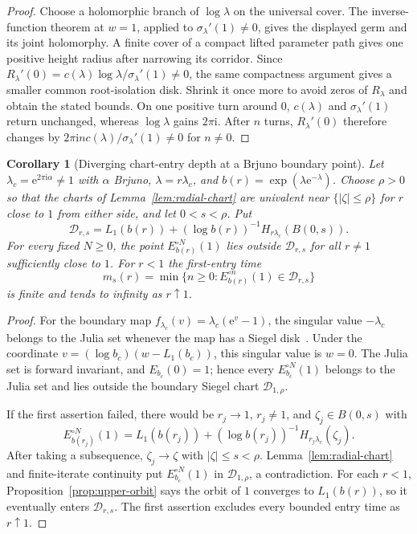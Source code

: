\documentclass[11pt,a4paper]{article}
\newtheorem{corollary}[theorem]{Corollary}
\theoremstyle{definition}
\newcommand{\eee}{\mathrm{e}}
\newcommand{\ii}{\mathrm{i}}
\begin{document}
\begin{proof}
Choose a holomorphic branch of $\log\lambda$ on the
universal cover.  The inverse-function theorem at $w=1$, applied to
$\sigma_\lambda'(1)\ne0$, gives the displayed germ and its joint
holomorphy.  A finite cover of a compact lifted parameter path gives
one positive height radius after narrowing its corridor.  Since
$R_\lambda'(0)=c(\lambda)\log\lambda/\sigma_\lambda'(1)\ne0$,
the same compactness argument gives a smaller common root-isolation
disk.  Shrink it once more to avoid zeros of $R_\lambda$ and obtain
the stated bounds.  On one positive turn around $0$, $c(\lambda)$ and
$\sigma_\lambda'(1)$ return unchanged, whereas $\log\lambda$ gains
$2\pi\ii$.  After $n$ turns, $R_\lambda'(0)$ therefore changes by
$2\pi\ii n c(\lambda)/\sigma_\lambda'(1)\ne0$ for $n\ne0$.
\end{proof}

\begin{corollary}[Diverging chart-entry depth at a Brjuno boundary point]
\label{cor:entry-depth}
Let $\lambda_c=\eee^{2\pi\ii\alpha}\ne1$ with $\alpha$ Brjuno,
$\lambda=r\lambda_c$, and
$b(r)=\exp(\lambda\eee^{-\lambda})$.  Choose $\rho>0$ so that the
charts of Lemma~\ref{lem:radial-chart} are univalent near
$\{|\zeta|\le\rho\}$ for $r$ close to $1$ from either side, and let
$0<s<\rho$.  Put
\[
 \mathcal D_{r,s}=L_1(b(r))+(\log b(r))^{-1}
                         H_{r\lambda_c}(B(0,s)).
\]
For every fixed $N\ge0$, the point $E_{b(r)}^{\circ N}(1)$ lies outside
$\mathcal D_{r,s}$ for all $r\ne1$ sufficiently close to $1$.
For $r<1$ the first-entry time
\[
 m_s(r)=\min\{n\ge0:E_{b(r)}^{\circ n}(1)\in\mathcal D_{r,s}\}
\]
is finite and tends to infinity as $r\uparrow1$.
\end{corollary}

\begin{proof}
For the boundary map $f_{\lambda_c}(v)=\lambda_c(\eee^v-1)$,
the singular value $-\lambda_c$ belongs to the Julia set whenever
the map has a Siegel disk~\cite[Introduction, remark after
Thm.~2]{Rempe2008}.  Under the coordinate
$v=(\log b_c)(w-L_1(b_c))$, this singular value is $w=0$.
The Julia set is forward invariant, and $E_{b_c}(0)=1$; hence
every $E_{b_c}^{\circ N}(1)$ belongs to the Julia set and lies outside
the boundary Siegel chart $\mathcal D_{1,\rho}$.

If the first assertion failed, there would be $r_j\to1$, $r_j\ne1$,
and $\zeta_j\in B(0,s)$ with
\[
 E_{b(r_j)}^{\circ N}(1)
 =L_1(b(r_j))+(\log b(r_j))^{-1}H_{r_j\lambda_c}(\zeta_j).
\]
After taking a subsequence, $\zeta_j\to\zeta$ with $|\zeta|\le s<\rho$.
Lemma~\ref{lem:radial-chart} and finite-iterate continuity put
$E_{b_c}^{\circ N}(1)$ in $\mathcal D_{1,\rho}$, a contradiction.
For each $r<1$, Proposition~\ref{prop:upper-orbit} says the orbit of $1$
converges to $L_1(b(r))$, so it eventually enters
$\mathcal D_{r,s}$.  The first assertion excludes every bounded entry
time as $r\uparrow1$.
\end{proof}
\end{document}
